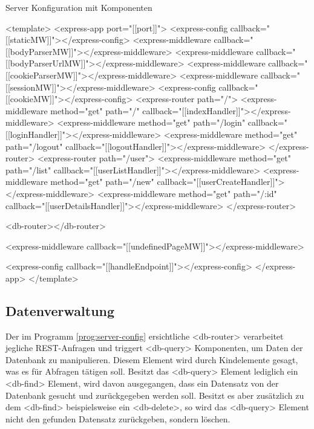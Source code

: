 \begin{program}
\caption{Server Konfiguration mit Komponenten}
\label{prog:server-config}
\begin{HtmlCode}
<template>
	<express-app port="[[port]]">
		<express-config callback="[[staticMW]]"></express-config>
		<express-middleware callback="[[bodyParserMW]]"></express-middleware>
		<express-middleware callback="[[bodyParserUrlMW]]"></express-middleware>
		<express-middleware callback="[[cookieParserMW]]"></express-middleware>
		<express-middleware callback="[[sessionMW]]"></express-middleware>
		<express-config callback="[[cookieMW]]"></express-config>
		<express-router path="/">
				<express-middleware method="get" path="/" callback="[[indexHandler]]"></express-middleware>\label{line:indexHandler}
				<express-middleware method="get" path="/login" callback="[[loginHandler]]"></express-middleware>
				<express-middleware method="get" path="/logout" callback="[[logoutHandler]]"></express-middleware>
		</express-router>
		<express-router path="/user">
				<express-middleware method="get" path="/list" callback="[[userListHandler]]"></express-middleware>
				<express-middleware method="get" path="/new" callback="[[userCreateHandler]]"></express-middleware>
				<express-middleware method="get" path="/:id" callback="[[userDetailsHandler]]"></express-middleware>
		</express-router>
		
		<db-router></db-router>
		
		<express-middleware callback="[[undefinedPageMW]]"></express-middleware>
		
		<express-config callback="[[handleEndpoint]]"></express-config>
	</express-app>
</template>
\end{HtmlCode}
\end{program}

\subsection{Datenverwaltung}
Der im Programm \ref{prog:server-config} ersichtliche <db-router> verarbeitet jegliche REST-Anfragen und triggert <db-query> Komponenten, um Daten der Datenbank zu manipulieren. Diesem Element wird durch Kindelemente gesagt, was es für Abfragen tätigen soll. Besitzt das <db-query> Element lediglich ein <db-find> Element, wird davon ausgegangen, dass ein Datensatz von der Datenbank gesucht und zurückgegeben werden soll. Besitzt es aber zusätzlich zu dem <db-find> beispielsweise ein <db-delete>, so wird das <db-query> Element nicht den gefunden Datensatz zurückgeben, sondern löschen. 
 
